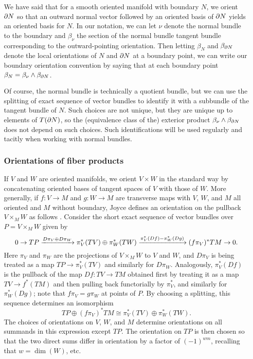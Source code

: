 \begin{example}
	We have said that for a smooth oriented manifold with boundary $N$, we orient $\partial N$ so that an outward normal vector followed by an oriented basis of $\partial N$ yields an oriented basis for $N$.
	In our notation, we can let $\nu$ denote the normal bundle to the boundary and $\beta_{\nu}$ the section of the normal bundle tangent bundle corresponding to the outward-pointing orientation.
	Then letting $\beta_N$ and $\beta_{\partial N}$ denote the local orientations of $N$ and $\partial N$ at a boundary point, we can write our boundary orientation convention by saying that at each boundary point $\beta_N=\beta_\nu\wedge \beta_{\partial N}$.

	Of course, the normal bundle is technically a quotient bundle, but we can use the splitting of exact sequence of vector bundles \cite[Theorem 3.9.6]{Hus75} to identify it with a subbundle of the tangent bundle of $N$.
	Such choices are not unique, but they are unique up to elements of $T(\partial N)$, so the (equivalence class of the) exterior product $\beta_\nu\wedge \beta_{\partial N}$ does not depend on such choices.
	Such identifications will be used regularly and tacitly when working with normal bundles.
\end{example}

\subsubsection{Orientations of fiber products}\label{S: orientation of fiber products}

If $V$ and $W$ are oriented manifolds, we orient $V \times W$ in the standard way by concatenating oriented bases of tangent spaces of $V$ with those of $W$.
More generally, if $f \colon V \to M$ and $g \colon W \to M$ are transverse maps with $V$, $W$, and $M$ all oriented and $M$ without boundary, Joyce defines an orientation on the pullback $V \times_M W$ as follows \cite[Convention 7.2b]{Joy12}.
Consider the short exact sequence of vector bundles over $P = V \times_M W$ given by
\begin{equation}\label{E: fiber orientation}
	0 \to TP \xrightarrow{D\pi_V \oplus D\pi_W} \pi_V^*(TV) \oplus \pi_W^*(TW) \xrightarrow{\pi_V^*(Df)-\pi_W^*(Dg)} (f\pi_V)^*TM \to 0.
\end{equation}
Here $\pi_V$ and $\pi_W$ are the projections of $V \times_M W$ to $V$ and $W$, and $D\pi_V$ is being treated as a map $TP \to \pi_V^*(TV)$ and similarly for $D\pi_W$.
Analogously, $\pi_V^*(Df)$ is the pullback of the map $Df \colon TV \to TM$ obtained first by treating it as a map $TV \to f^*(TM)$ and then pulling back functorially by $\pi_V^*$, and similarly for $\pi_W^*(Dg)$; note that $f\pi_V = g\pi_W$ at points of $P$.
By choosing a splitting, this sequence determines an isomorphism
\begin{equation*}
	TP \oplus (f\pi_V)^*TM\cong\pi_V^*(TV) \oplus \pi_W^*(TW).
\end{equation*}
The choices of orientations on $V$, $W$, and $M$ determine orientations on all summands in this expression except $TP$.
The orientation on $TP$ is then chosen so that the two direct sums differ in orientation by a factor of $(-1)^{wm}$, recalling that $w=\dim(W)$, etc.

